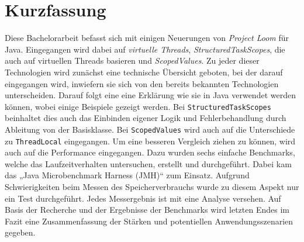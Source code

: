\chapter{Kurzfassung}

    Diese Bachelorarbeit befasst sich mit einigen Neuerungen von \emph{Project Loom} für Java. Eingegangen wird dabei auf \emph{virtuelle Threads}, \emph{StructuredTaskScopes},
    die auch auf virtuellen Threads basieren
    und \emph{ScopedValues}.
    Zu jeder dieser Technologien wird zunächst eine technische Übersicht geboten, bei der darauf eingegangen wird, inwiefern sie sich von den bereits bekannten Technologien unterscheiden.
    Darauf folgt eine eine Erklärung wie sie in Java verwendet werden können, wobei einige Beispiele gezeigt werden. 
    Bei \texttt{StructuredTaskScopes} beinhaltet dies auch das Einbinden eigener Logik und Fehlerbehandlung durch Ableitung von der Basisklasse. Bei \texttt{ScopedValues} wird auch auf die Unterschiede zu \texttt{ThreadLocal} eingegangen. 
    Um eine besseren Vergleich ziehen zu können, wird auch auf die Performance eingegangen. Dazu wurden sechs einfache Benchmarks,
    welche das Laufzeitverhalten untersuchen, erstellt und durchgeführt. Dabei kam das
    „Java Microbenchmark Harness (JMH)“ zum Einsatz. Aufgrund Schwierigkeiten
    beim Messen des Speicherverbrauchs wurde zu diesem Aspekt nur ein Test durchgeführt. Jedes Messergebnis ist mit eine Analyse versehen.
    Auf Basis der Recherche und der Ergebnisse der Benchmarks wird letzten Endes im Fazit eine Zusammenfassung der Stärken und potentiellen Anwendungsszenarien gegeben.